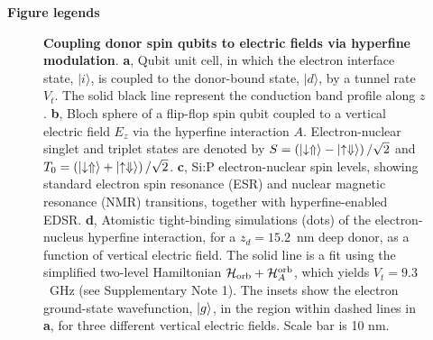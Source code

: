\documentclass[aps,prb,superscriptaddress,nobibnotes,preprint]{revtex4-1}%
\begin{document}
\clearpage
\noindent\textbf{\large Figure legends}

\begin{figure}[h]
	\centering
	\caption{\textbf{Coupling donor spin qubits to electric fields via hyperfine modulation}. 
	\textbf{a}, Qubit unit cell, in which the electron interface state, $|i\rangle$, is coupled to the donor-bound state, $|d\rangle$, by a tunnel rate $V_t$. The solid black line represent the conduction band profile along $z$.
	\textbf{b}, Bloch sphere of a flip-flop spin qubit coupled to a vertical electric field $E_z$ via the hyperfine interaction $A$. Electron-nuclear singlet and triplet states are denoted by $S=\left(\ket{\downarrow\Uparrow}-\ket{\uparrow\Downarrow}\right)/\sqrt{2}$ and $T_0=\left(\ket{\downarrow\Uparrow}+\ket{\uparrow\Downarrow}\right)/\sqrt{2}$. \textbf{c}, Si:P electron-nuclear spin levels, showing standard electron spin resonance (ESR) and nuclear magnetic resonance (NMR) transitions, together with hyperfine-enabled EDSR. 
	\textbf{d}, Atomistic tight-binding simulations \cite{Klimeck2007} (dots) of the electron-nucleus hyperfine interaction, for a $z_d=15.2$~nm deep donor, as a function of vertical electric field. The solid line is a fit using the simplified two-level Hamiltonian $\mathcal{H}_{\rm orb}+\mathcal{H}_A^{\rm orb}$, which yields $V_t=9.3$~GHz (see Supplementary Note 1). The insets show the electron ground-state wavefunction, $\ket{g}$, in the region within dashed lines in \textbf{a}, for three different vertical electric fields. Scale bar is 10 nm.}
	\label{fig:A(E)}
\end{figure}\clearpage
\end{document}
